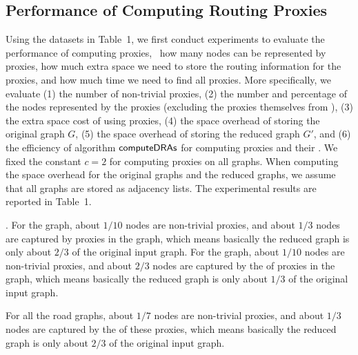 \subsection{Performance of Computing Routing Proxies}
Using the datasets in Table~1, we first conduct experiments to evaluate the performance of computing proxies, \ie\ how many nodes can be represented by proxies, how much extra space we need to store the routing information for the proxies, and how much time we need to find all proxies. More specifically, we evaluate (1) the number of non-trivial proxies, (2) the number and percentage of the nodes represented by the proxies (excluding the proxies themselves from \dras), (3) the extra space cost of using proxies, (4) the space overhead of storing the original graph $G$, (5) the space overhead of storing the reduced graph $G'$, and (6) the efficiency of algorithm ${\mathsf{computeDRAs}}$ for computing proxies and their \dras. We fixed the constant $c = 2$ for computing proxies on all graphs. When computing the space overhead for the original graphs and the reduced graphs, we assume that all graphs are stored as adjacency lists. The experimental results are reported in Table~1.

.
For the \dblp graph, about $1/10$ nodes are non-trivial proxies, and about $1/3$ nodes are captured by proxies in the graph, which means basically the reduced graph is only about $2/3$ of the original input graph. For the \dblpone graph, about $1/10$ nodes are non-trivial proxies, and about $2/3$ nodes are captured by the \dras of proxies in the graph, which means basically the reduced graph is only about $1/3$ of the original input graph.

For all the road graphs,  about $1/7$ nodes are non-trivial proxies, and about $1/3$ nodes are captured by the \dras of these proxies, which means basically the reduced graph is only about $2/3$ of the original input graph.

